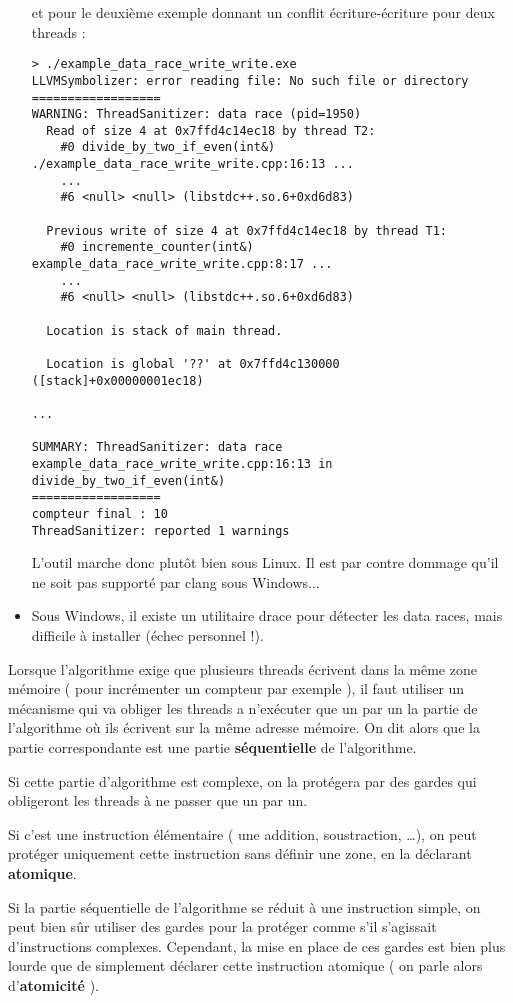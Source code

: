 \documentclass[fleqn,11pt]{article}
\begin{document}
\begin{itemize}
et pour le deuxième exemple donnant un conflit écriture-écriture pour deux threads :
\begin{verbatim}
> ./example_data_race_write_write.exe
LLVMSymbolizer: error reading file: No such file or directory
==================
WARNING: ThreadSanitizer: data race (pid=1950)
  Read of size 4 at 0x7ffd4c14ec18 by thread T2:
    #0 divide_by_two_if_even(int&) ./example_data_race_write_write.cpp:16:13 ...
    ...
    #6 <null> <null> (libstdc++.so.6+0xd6d83)

  Previous write of size 4 at 0x7ffd4c14ec18 by thread T1:
    #0 incremente_counter(int&) example_data_race_write_write.cpp:8:17 ...
    ...
    #6 <null> <null> (libstdc++.so.6+0xd6d83)

  Location is stack of main thread.

  Location is global '??' at 0x7ffd4c130000 ([stack]+0x00000001ec18)

...

SUMMARY: ThreadSanitizer: data race example_data_race_write_write.cpp:16:13 in divide_by_two_if_even(int&)
==================
compteur final : 10
ThreadSanitizer: reported 1 warnings
\end{verbatim}

  L'outil marche donc plutôt bien sous Linux. Il est par contre dommage qu'il ne soit pas supporté par
  clang sous Windows...
\item Sous Windows, il existe un utilitaire drace pour détecter les data races, mais difficile à installer (échec personnel !).
\end{itemize}

Lorsque l'algorithme exige que plusieurs threads écrivent dans la même zone mémoire ( pour incrémenter un
compteur par exemple ), il faut utiliser un mécanisme qui va obliger les threads a n'exécuter que un par un
la partie de l'algorithme où ils écrivent sur la même adresse mémoire. On dit alors que la partie correspondante est une partie \textbf{séquentielle} de l'algorithme.

Si cette partie d'algorithme est complexe, on la protégera par des gardes qui obligeront les threads à ne passer que un par un.

Si c'est une instruction élémentaire ( une addition, soustraction, \ldots ), on peut protéger uniquement cette instruction sans définir une zone, en la déclarant \textbf{atomique}.

Si la partie séquentielle de l'algorithme se réduit à une instruction simple, on peut bien sûr utiliser des gardes pour la protéger comme s'il s'agissait d'instructions complexes. Cependant, la mise en place de ces gardes est bien plus lourde que de simplement déclarer cette instruction atomique ( on parle alors d'\textbf{atomicité} ).
\end{document}
